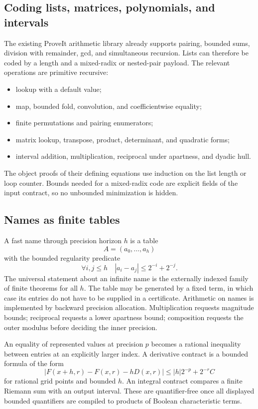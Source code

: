 \subsection{Coding lists, matrices, polynomials, and intervals}

The existing ProveIt arithmetic library already supports pairing, bounded sums, division with remainder, gcd, and simultaneous recursion.  Lists can therefore be coded by a length and a mixed-radix or nested-pair payload.  The relevant operations are primitive recursive:
\begin{itemize}
  \item lookup with a default value;
  \item map, bounded fold, convolution, and coefficientwise equality;
  \item finite permutations and pairing enumerators;
  \item matrix lookup, transpose, product, determinant, and quadratic forms;
  \item interval addition, multiplication, reciprocal under apartness, and dyadic hull.
\end{itemize}
The object proofs of their defining equations use induction on the list length or loop counter.  Bounds needed for a mixed-radix code are explicit fields of the input contract, so no unbounded minimization is hidden.

\subsection{Names as finite tables}

A fast name through precision horizon $h$ is a table
\[
 A=(a_0,\dots,a_h)
\]
with the bounded regularity predicate
\begin{equation}\label{eq:finite-fast}
 \forall i,j\le h\quad
 |a_i-a_j|\le2^{-i}+2^{-j}.
\end{equation}
The universal statement about an infinite name is the externally indexed family of finite theorems for all $h$.  The table may be generated by a fixed  term, in which case its entries do not have to be supplied in a certificate.  Arithmetic on names is implemented by backward precision allocation.  Multiplication requests magnitude bounds; reciprocal requests a lower apartness bound; composition requests the outer modulus before deciding the inner precision.

An equality of represented values at precision $p$ becomes a rational inequality between entries at an explicitly larger index.  A derivative contract is a bounded formula of the form
\begin{equation}\label{eq:derivative-contract}
 |F(x+h,r)-F(x,r)-hD(x,r)|
 \le |h|2^{-p}+2^{-r}C
\end{equation}
for rational grid points and bounded $h$.  An integral contract compares a finite Riemann sum with an output interval.  These are quantifier-free once all displayed bounded quantifiers are compiled to products of Boolean characteristic terms.

